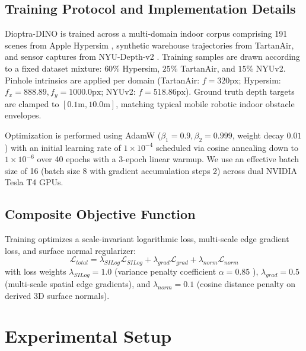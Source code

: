 \documentclass[10pt,twocolumn,letterpaper]{article}
\begin{document}
\subsection{Training Protocol and Implementation Details}
Dioptra-DINO is trained across a multi-domain indoor corpus comprising 191 scenes from Apple Hypersim \cite{roberts2021hypersim}, synthetic warehouse trajectories from TartanAir, and sensor captures from NYU-Depth-v2 \cite{silberman2012indoor}. Training samples are drawn according to a fixed dataset mixture: $60\%$ Hypersim, $25\%$ TartanAir, and $15\%$ NYUv2. Pinhole intrinsics are applied per domain (TartanAir: $f=320\text{px}$; Hypersim: $f_x=888.89, f_y=1000.0\text{px}$; NYUv2: $f=518.86\text{px}$). Ground truth depth targets are clamped to $[0.1\text{m}, 10.0\text{m}]$, matching typical mobile robotic indoor obstacle envelopes.

Optimization is performed using AdamW ($\beta_1=0.9, \beta_2=0.999$, weight decay $0.01$) with an initial learning rate of $1 \times 10^{-4}$ scheduled via cosine annealing down to $1 \times 10^{-6}$ over 40 epochs with a 3-epoch linear warmup. We use an effective batch size of 16 (batch size 8 with gradient accumulation steps 2) across dual NVIDIA Tesla T4 GPUs.

\subsection{Composite Objective Function}
Training optimizes a scale-invariant logarithmic loss, multi-scale edge gradient loss, and surface normal regularizer:
\begin{equation}
\mathcal{L}_{total} = \lambda_{SILog} \mathcal{L}_{SILog} + \lambda_{grad} \mathcal{L}_{grad} + \lambda_{norm} \mathcal{L}_{norm}
\end{equation}
with loss weights $\lambda_{SILog} = 1.0$ (variance penalty coefficient $\alpha=0.85$ \cite{eigen2014depth}), $\lambda_{grad} = 0.5$ (multi-scale spatial edge gradients), and $\lambda_{norm} = 0.1$ (cosine distance penalty on derived 3D surface normals).

\section{Experimental Setup}
\end{document}
